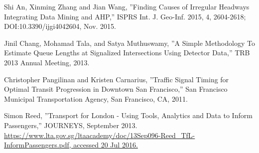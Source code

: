 \documentclass[12pt]{report}
\begin{document}
\begin{thebibliography}{14}
Shi An, Xinming Zhang and Jian Wang, ''Finding Causes of Irregular Headways Integrating Data Mining and AHP,'' ISPRS Int. J. Geo-Inf. 2015, 4, 2604-2618; DOI:10.3390/ijgi4042604, Nov. 2015.

Jinil Chang, Mohamad Tala, and Satya Muthuswamy, ''A Simple Methodology To Estimate Queue Lengths at Signalized Intersections Using Detector Data,'' TRB 2013 Annual Meeting, 2013.

Christopher Pangilinan and Kristen Carnarius, ''Traffic Signal Timing for Optimal Transit Progression in Downtown San Francisco,'' San Francisco Municipal Transportation Agency, San Francisco, CA, 2011.

Simon Reed, ''Transport for London - Using Tools, Analytics and Data to Inform Passengers,'' JOURNEYS, September 2013. \url{https://www.lta.gov.sg/ltaacademy/doc/13Sep096-Reed_TfL-InformPassengers.pdf, accessed 20 Jul 2016.}





\end{thebibliography}
\end{document}
